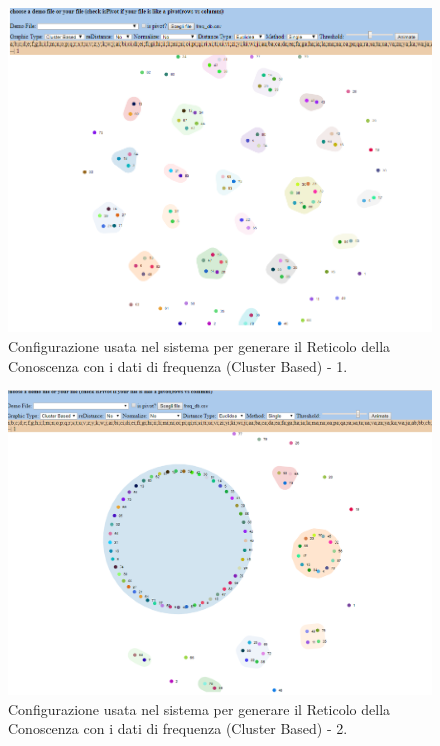 \noindent
\begin{figure}[H]
\centering
	\includegraphics[width=1\linewidth]{./image/Reticolo_db-frequenza.png}
	\caption{Configurazione usata nel sistema per generare il Reticolo della Conoscenza con i dati di frequenza (Cluster Based) - 1.}
	\label{Configurazione usata nel sistema per generare il Reticolo della Conoscenza con i dati di frequenza (Cluster Based) - 1.}
\end{figure}
\noindent

\noindent
\begin{figure}[H]
\centering
	\includegraphics[width=1\linewidth]{./image/Reticolo_db-frequenza-2.png}
	\caption{Configurazione usata nel sistema per generare il Reticolo della Conoscenza con i dati di frequenza (Cluster Based) - 2.}
	\label{Configurazione usata nel sistema per generare il Reticolo della Conoscenza con i dati di frequenza (Cluster Based) - 2.}
\end{figure}
\noindent

